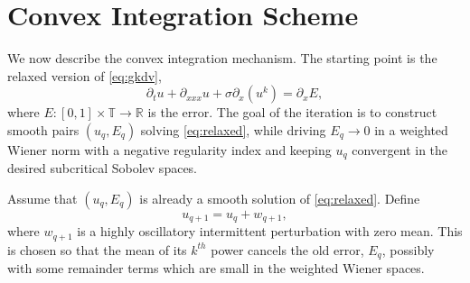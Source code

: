 \documentclass[12pt,reqno,letterpaper]{amsart}
\numberwithin{equation}{section}
\newcommand{\1}{{\bf 1}}
\newcommand{\2}{{\bf 2}}
\newcommand{\R}{\mathbb R}
\newcommand{\T}{\mathbb T}
\theoremstyle{remark}
\theoremstyle{remark}
\begin{document}
\section{Convex Integration Scheme}\label{sec:3}
We now describe the convex integration mechanism. The starting point is the relaxed version of \eqref{eq:gkdv}, 
\begin{equation}\label{eq:relaxed}
    \partial_t u + \partial_{xxx} u + \sigma \partial_x\left(u^k\right) = \partial_x E,
\end{equation}
where $E:[0,1]\times\T\to\R$ is the error. The goal of the iteration is to construct smooth pairs $(u_q,E_q)$ solving \eqref{eq:relaxed}, while driving $E_q\to0$ in a weighted Wiener norm with a negative regularity index and keeping $u_q$ convergent in the desired subcritical Sobolev spaces.

Assume that $(u_q,E_q)$ is already a smooth solution of \eqref{eq:relaxed}. Define
\begin{equation}\label{eq:uq+1}
    u_{q+1}=u_q+w_{q+1},
\end{equation}
where $w_{q+1}$ is a highly oscillatory intermittent perturbation with zero mean. This is chosen so that the mean of its $k^{th}$ power cancels the old error, $E_q$, possibly with some remainder terms which are small in the weighted Wiener spaces.

\end{document}
